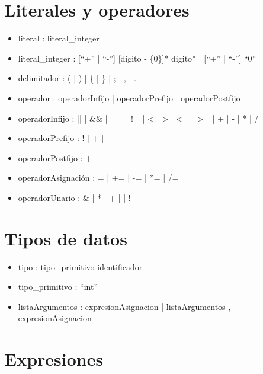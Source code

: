 \section{Literales y operadores}

\begin{itemize}
\item literal : literal\_integer
\item literal\_integer : [``+'' | ``-''] [digito - \{0\}]* digito* | [``+'' | ``-''] ``0''
\item delimitador : ( | ) | \{ | \} | ; | , | .
\item operador : operadorInfijo | operadorPrefijo | operadorPostfijo
\item operadorInfijo : || | \&\& | == | != | < | > | <= | >= | + | - | * | /
\item operadorPrefijo : ! | + | -
\item operadorPostfijo : ++ | --
\item operadorAsignaci\'on : = | += | -= | *= | /=
\item operadorUnario : \& | * | + | \- | !
\end{itemize}

\section{Tipos de datos}

\begin{itemize}
\item tipo : tipo\_primitivo identificador
\item tipo\_primitivo : ``int''
\item listaArgumentos : expresionAsignacion | listaArgumentos , expresionAsignacion
\end{itemize}

\section{Expresiones}

